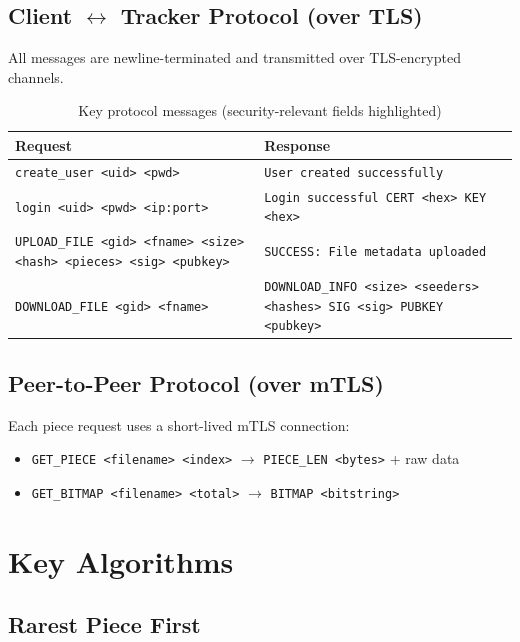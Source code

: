 \documentclass[12pt,a4paper]{article}
\begin{document}
\subsection{Client $\leftrightarrow$ Tracker Protocol (over TLS)}

All messages are newline-terminated and transmitted over TLS-encrypted channels.

\begin{table}[h]
\centering
\small
\begin{tabular}{@{}p{5cm}p{7cm}@{}}
\toprule
\textbf{Request} & \textbf{Response} \\
\midrule
\texttt{create\_user <uid> <pwd>} & \texttt{User created successfully} \\
\texttt{login <uid> <pwd> <ip:port>} & \texttt{Login successful CERT <hex> KEY <hex>} \\
\texttt{UPLOAD\_FILE <gid> <fname> <size> <hash> <pieces> <sig> <pubkey>} & \texttt{SUCCESS: File metadata uploaded} \\
\texttt{DOWNLOAD\_FILE <gid> <fname>} & \texttt{DOWNLOAD\_INFO <size> <seeders> <hashes> SIG <sig> PUBKEY <pubkey>} \\
\bottomrule
\end{tabular}
\caption{Key protocol messages (security-relevant fields highlighted)}
\end{table}

\subsection{Peer-to-Peer Protocol (over mTLS)}

Each piece request uses a short-lived mTLS connection:

\begin{itemize}
    \item \texttt{GET\_PIECE <filename> <index>} $\rightarrow$ \texttt{PIECE\_LEN <bytes>} + raw data
    \item \texttt{GET\_BITMAP <filename> <total>} $\rightarrow$ \texttt{BITMAP <bitstring>}
\end{itemize}

\section{Key Algorithms}

\subsection{Rarest Piece First}
\end{document}
